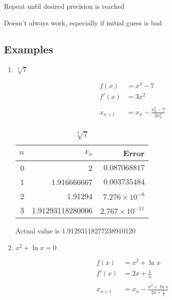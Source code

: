 \documentclass[letterpaper, landscape]{exam}
\begin{document}
  \begin{itemize*}
    \item Repeat until desired precision is reached
    \item Doesn't always work, especially if initial guess is bad
  \end{itemize*}

  \subsection{Examples} %
  
  \begin{enumerate}
    \item $\sqrt[3]{7}$

      \begin{align*}
        f(x)      & = x^3 - 7\\
        f'(x)     & = 3x^2 \\
        \\
        x_{n + 1} & = x_n - \frac{x_n^3 - 7}{3x_n^2} \\
      \end{align*}

      \begin{table}[H]
        \centering
        \begin{tabular}[H]{rrr}
          \toprule
          $n$ & $x_n$            & Error \\
          \midrule
          0   & 2                & $0.087068817$ \\
          1   & 1.916666667      & $0.003735484$ \\
          2   & 1.91294          & $7.276 \times 10^{-6}$ \\
          3   & 1.91293118280006 & $2.767 \times 10^{-11}$ \\
          \bottomrule
        \end{tabular}
        \caption{$\sqrt[3]{7}$}
      \end{table}

      Actual value is 1.91293118277238910120 

    \item $x^2 + \ln x = 0$

      \begin{align*}
        f(x)      & = x^2 + \ln x \\
        f'(x)     & = 2x + \frac{1}{x} \\
        \\
        x_{n + 1} & = x_n - \frac{x^2 + \ln x}{2x + \frac{1}{x}} \\
      \end{align*}


\end{enumerate}
\end{document}
